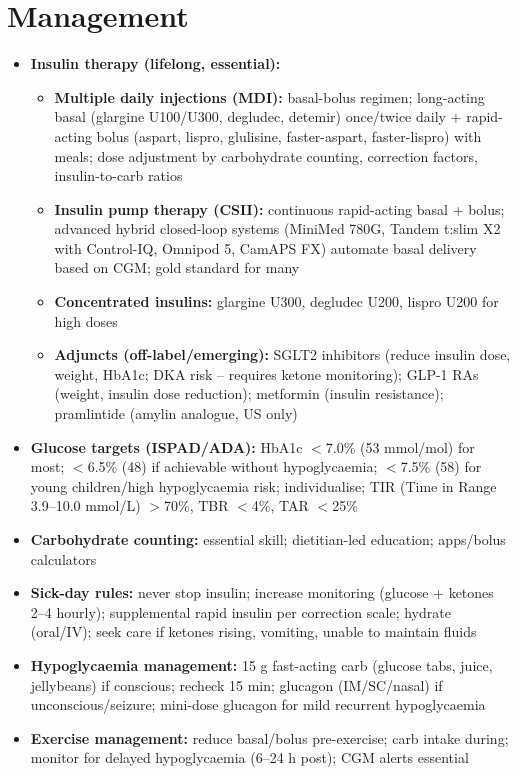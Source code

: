\section*{Management}
\begin{itemize}
    \item \textbf{Insulin therapy (lifelong, essential):}
    \begin{itemize}
        \item \textbf{Multiple daily injections (MDI):} basal-bolus regimen; long-acting basal (glargine U100/U300, degludec, detemir) once/twice daily + rapid-acting bolus (aspart, lispro, glulisine, faster-aspart, faster-lispro) with meals; dose adjustment by carbohydrate counting, correction factors, insulin-to-carb ratios
        \item \textbf{Insulin pump therapy (CSII):} continuous rapid-acting basal + bolus; advanced hybrid closed-loop systems (MiniMed 780G, Tandem t:slim X2 with Control-IQ, Omnipod 5, CamAPS FX) automate basal delivery based on CGM; gold standard for many
        \item \textbf{Concentrated insulins:} glargine U300, degludec U200, lispro U200 for high doses
        \item \textbf{Adjuncts (off-label/emerging):} SGLT2 inhibitors (reduce insulin dose, weight, HbA1c; DKA risk -- requires ketone monitoring); GLP-1 RAs (weight, insulin dose reduction); metformin (insulin resistance); pramlintide (amylin analogue, US only)
    \end{itemize}
    \item \textbf{Glucose targets (ISPAD/ADA):} HbA1c $<$7.0\% (53 mmol/mol) for most; $<$6.5\% (48) if achievable without hypoglycaemia; $<$7.5\% (58) for young children/high hypoglycaemia risk; individualise; TIR (Time in Range 3.9--10.0 mmol/L) $>$70\%, TBR $<$4\%, TAR $<$25\%
    \item \textbf{Carbohydrate counting:} essential skill; dietitian-led education; apps/bolus calculators
    \item \textbf{Sick-day rules:} never stop insulin; increase monitoring (glucose + ketones 2--4 hourly); supplemental rapid insulin per correction scale; hydrate (oral/IV); seek care if ketones rising, vomiting, unable to maintain fluids
    \item \textbf{Hypoglycaemia management:} 15 g fast-acting carb (glucose tabs, juice, jellybeans) if conscious; recheck 15 min; glucagon (IM/SC/nasal) if unconscious/seizure; mini-dose glucagon for mild recurrent hypoglycaemia
    \item \textbf{Exercise management:} reduce basal/bolus pre-exercise; carb intake during; monitor for delayed hypoglycaemia (6--24 h post); CGM alerts essential

\end{itemize}
